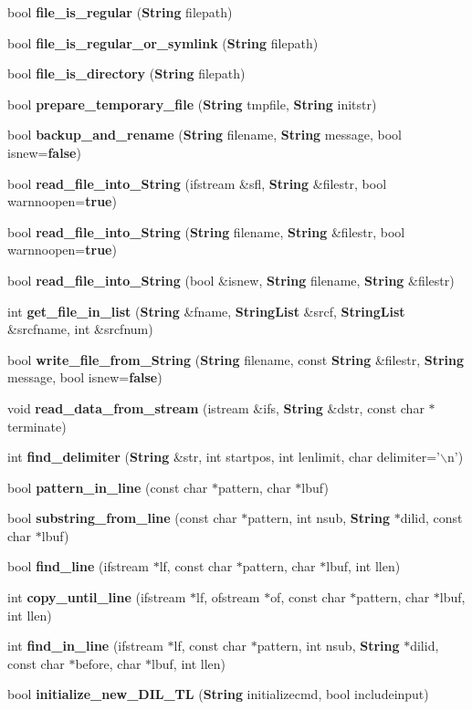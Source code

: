 \begin{CompactItemize}
bool {\bf file\_\-is\_\-regular} ({\bf String} filepath)
\item 
bool {\bf file\_\-is\_\-regular\_\-or\_\-symlink} ({\bf String} filepath)
\item 
bool {\bf file\_\-is\_\-directory} ({\bf String} filepath)
\item 
bool {\bf prepare\_\-temporary\_\-file} ({\bf String} tmpfile, {\bf String} initstr)
\item 
bool {\bf backup\_\-and\_\-rename} ({\bf String} filename, {\bf String} message, bool isnew={\bf false})
\item 
bool {\bf read\_\-file\_\-into\_\-String} (ifstream \&sfl, {\bf String} \&filestr, bool warnnoopen={\bf true})
\item 
bool {\bf read\_\-file\_\-into\_\-String} ({\bf String} filename, {\bf String} \&filestr, bool warnnoopen={\bf true})
\item 
bool {\bf read\_\-file\_\-into\_\-String} (bool \&isnew, {\bf String} filename, {\bf String} \&filestr)
\item 
int {\bf get\_\-file\_\-in\_\-list} ({\bf String} \&fname, {\bf String\-List} \&srcf, {\bf String\-List} \&srcfname, int \&srcfnum)
\item 
bool {\bf write\_\-file\_\-from\_\-String} ({\bf String} filename, const {\bf String} \&filestr, {\bf String} message, bool isnew={\bf false})
\item 
void {\bf read\_\-data\_\-from\_\-stream} (istream \&ifs, {\bf String} \&dstr, const char $\ast$terminate)
\item 
int {\bf find\_\-delimiter} ({\bf String} \&str, int startpos, int lenlimit, char delimiter='$\backslash$n')
\item 
bool {\bf pattern\_\-in\_\-line} (const char $\ast$pattern, char $\ast$lbuf)
\item 
bool {\bf substring\_\-from\_\-line} (const char $\ast$pattern, int nsub, {\bf String} $\ast$dilid, const char $\ast$lbuf)
\item 
bool {\bf find\_\-line} (ifstream $\ast$lf, const char $\ast$pattern, char $\ast$lbuf, int llen)
\item 
int {\bf copy\_\-until\_\-line} (ifstream $\ast$lf, ofstream $\ast$of, const char $\ast$pattern, char $\ast$lbuf, int llen)
\item 
int {\bf find\_\-in\_\-line} (ifstream $\ast$lf, const char $\ast$pattern, int nsub, {\bf String} $\ast$dilid, const char $\ast$before, char $\ast$lbuf, int llen)
\item 
bool {\bf initialize\_\-new\_\-DIL\_\-TL} ({\bf String} initializecmd, bool includeinput)

\end{CompactItemize}
